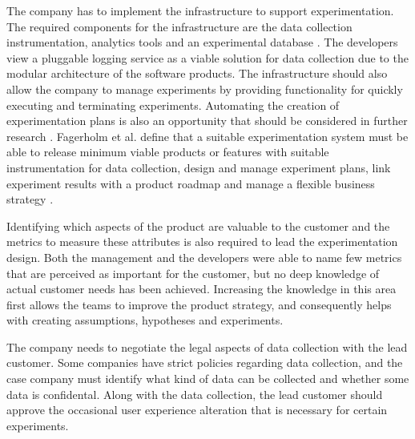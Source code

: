 \documentclass[english, grading]{tktltiki2}
\theoremstyle{definition}
\theoremstyle{remark}
\begin{document}
The company has to implement the infrastructure to support experimentation. The required components for the infrastructure are the data collection instrumentation, analytics tools and an experimental database \cite{kohavi2007practical, fagerholm2014building}. The developers view a pluggable logging service as a viable solution for data collection due to the modular architecture of the software products. The infrastructure should also allow the company to manage experiments by providing functionality for quickly executing and terminating experiments. Automating the creation of experimentation plans is also an opportunity that should be considered in further research \cite{fagerholm2014building}. Fagerholm et al. define that a suitable experimentation system must be able to release minimum viable products or features with suitable instrumentation for data collection, design and manage experiment plans, link experiment results with a product roadmap and manage a flexible business strategy \cite{fagerholm2014building}.

Identifying which aspects of the product are valuable to the customer and the metrics to measure these attributes is also required to lead the experimentation design. Both the management and the developers were able to name few metrics that are perceived as important for the customer, but no deep knowledge of actual customer needs has been achieved. Increasing the knowledge in this area first allows the teams to improve the product strategy, and consequently helps with creating assumptions, hypotheses and experiments. 

The company needs to negotiate the legal aspects of data collection with the lead customer. Some companies have strict policies regarding data collection, and the case company must identify what kind of data can be collected and whether some data is confidental. Along with the data collection, the lead customer should approve the occasional user experience alteration that is necessary for certain experiments. 
\end{document}
